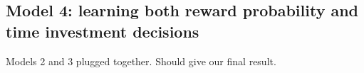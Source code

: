 \subsection{Model 4: learning both reward probability and time investment decisions}

Models 2 and 3 plugged together.
Should give our final result.